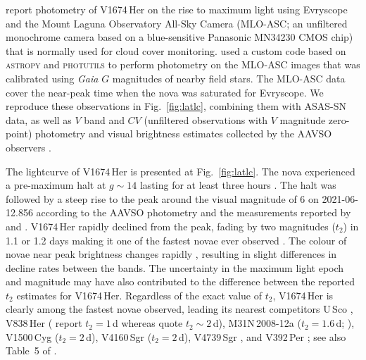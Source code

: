 \documentclass[a4paper,fleqn,usenatbib]{mnras}
\newcommand{\nova}{V1674\,Her}
\begin{document}
\cite{2021RNAAS...5..160Q} report photometry of \nova{} on the rise to maximum light using 
Evryscope \citep[$g$ band;][]{2014SPIE.9145E..0ZL} and the Mount Laguna Observatory All-Sky Camera 
(MLO-ASC; an unfiltered monochrome camera based on a blue-sensitive Panasonic MN34230 CMOS chip) that
is normally used for cloud cover monitoring. \cite{2021RNAAS...5..160Q} used a custom code based on \textsc{astropy} and \textsc{photutils} 
to perform photometry on the MLO-ASC images that 
was calibrated using {\em Gaia} $G$ magnitudes of nearby field stars. 
The MLO-ASC data cover the near-peak time when the nova was saturated for Evryscope. 
We reproduce these observations in Fig.~\ref{fig:latlc}, 
combining them with ASAS-SN \citep[$g$ band;][]{2014ApJ...788...48S,2017PASP..129j4502K}
data, as well as $V$ band and $CV$ (unfiltered observations with $V$ magnitude zero-point)
photometry and visual brightness estimates collected by the AAVSO observers \citep{AAVSODATA}. 

The lightcurve of \nova{} is presented at Fig.~\ref{fig:latlc}. 
The nova experienced a pre-maximum halt at $g \sim 14$ lasting for at least
three hours \citep{2021RNAAS...5..160Q}. 
The halt was followed by a steep rise to the peak around the visual magnitude of 6 on 2021-06-12.856 according to the AAVSO photometry \citep{AAVSODATA}
and the measurements reported by \cite{2021CBET.4976....1U} and \cite{2021CBET.4977....1K}.
\nova{} rapidly declined from the peak, fading by two magnitudes ($t_2$) 
in 1.1 \citep{2021RNAAS...5..160Q} 
or 1.2 days \citep{2021PZ.....41....4S} making it one of the fastest novae ever observed 
\citep{2021ApJ...922L..10W,2022RNAAS...6..124W}. 
The colour of novae near peak brightness changes rapidly 
\citep[due to changing photospheric temperature and development of emission lines;][]{1987A&AS...70..125V}, 
resulting in slight differences in decline rates between the bands.
The uncertainty in the maximum light epoch and magnitude may have also
contributed to the difference between the reported $t_2$ estimates for \nova{}.
Regardless of the exact value of $t_2$, \nova{} is clearly among the fastest
novae observed, leading its nearest competitors 
U\,Sco \citep[$t_2=1.2$\,d;][]{2010ApJS..187..275S}, 
V838\,Her (\citealt{2010AJ....140...34S} report $t_2=1$\,d 
whereas \citealt{1996MNRAS.282..563V} quote $t_2\sim2$\,d),
M31N\,2008-12a ($t_2=1.6$\,d; \citealt{2016ApJ...833..149D}),
V1500\,Cyg ($t_2=2$\,d),
V4160\,Sgr ($t_2=2$\,d), 
V4739\,Sgr \citep[$t_2=2$\,d;][]{2010AJ....140...34S}, and
V392\,Per \citep[$t_2=2$\,d;][]{2022MNRAS.514.6183M}; see also Table~5 of
\cite{2016ApJ...833..149D}.
\end{document}
